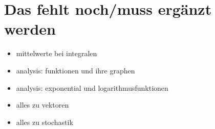 \chapter{Das fehlt noch/muss ergänzt werden}
\begin{itemize}
    \item mittelwerte bei integralen
    \item analysis: funktionen und ihre graphen
    \item analysis: exponential und logarithmusfunktionen
    \item alles zu vektoren
    \item alles zu stochastik
\end{itemize}
